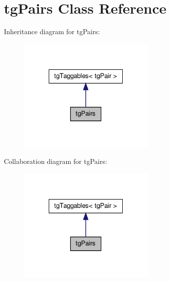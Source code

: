 \hypertarget{classtg_pairs}{\section{tg\-Pairs Class Reference}
\label{classtg_pairs}
}


Inheritance diagram for tg\-Pairs\-:\nopagebreak
\begin{figure}[H]
\begin{center}
\leavevmode
\includegraphics[width=192pt]{classtg_pairs__inherit__graph}
\end{center}
\end{figure}


Collaboration diagram for tg\-Pairs\-:\nopagebreak
\begin{figure}[H]
\begin{center}
\leavevmode
\includegraphics[width=192pt]{classtg_pairs__coll__graph}
\end{center}
\end{figure}
